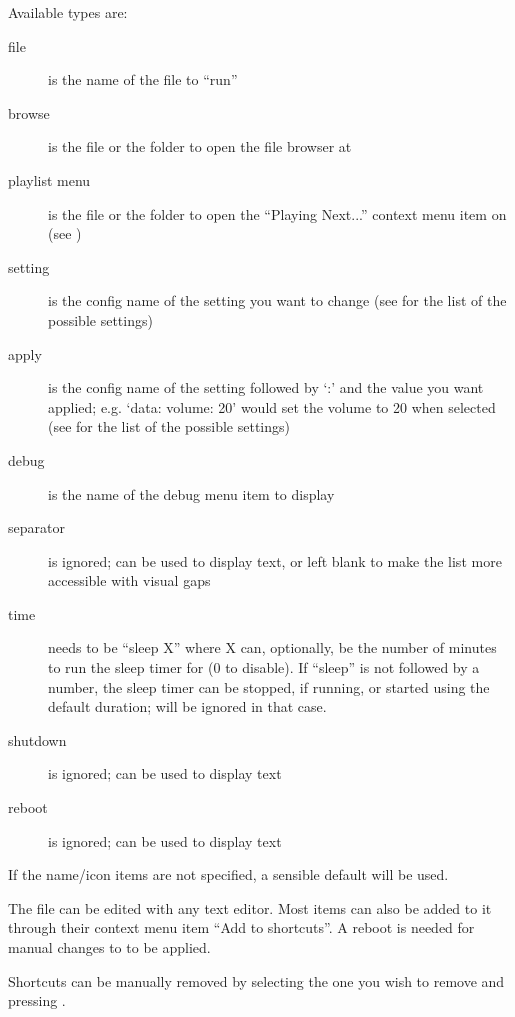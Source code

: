 Available types are:
\begin{description}
\item[file]  is the name of the file to ``run''
\item[browse]  is the file or the folder to open the file browser at
\item[playlist menu]  is the file or the folder to open the
  ``Playing Next...'' context menu item on (see )
\item[setting]  is the config name of the setting you want to change
  (see  for the list of the possible settings)
\item[apply]  is the config name of the setting followed by `:'
  and the value you want applied; e.g. `data: volume: 20' would set the volume to 20 when selected
  (see  for the list of the possible settings)
\item[debug]  is the name of the debug menu item to display
\item[separator]  is ignored;  can be used to display text,
  or left blank to make the list more accessible with visual gaps
\item[time]  needs to be ``sleep X''
  where X can, optionally, be the number of minutes to run the sleep timer for (0 to disable).
  If ``sleep'' is not followed by a number, the sleep timer can be stopped, if running,
  or started using the default duration;  will be ignored in that case.
\item[shutdown]  is ignored;  can be used to display text
\item[reboot]  is ignored;  can be used to display text
\end{description}

If the name/icon items are not specified, a sensible default will be used.


The file  can be edited with any text editor. Most items can
also be added to it through their context menu item ``Add to shortcuts''.
A reboot is needed for manual changes to  to be applied.

Shortcuts can be manually removed by selecting the one you wish to remove and pressing
\ActionStdContext{}.
